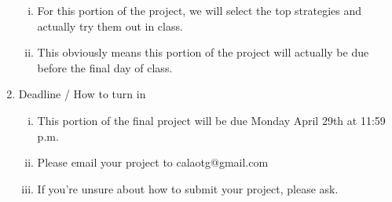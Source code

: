 \documentclass[11.5pt]{article}
\begin{document}
\begin{enumerate}
	\begin{enumerate}[(i)]
	\item For this portion of the project, we will select the top strategies and actually try them out in class.
	\item This obviously means this portion of the project will actually be due before the final day of class.
	\end{enumerate}
\item Deadline / How to turn in
	\begin{enumerate}[(i)]
	\item This portion of the final project will be due Monday April 29th at 11:59 p.m.
	\item Please email your project to calaotg@gmail.com
	\item If you're unsure about how to submit your project, please ask.
	\end{enumerate}
\end{enumerate}
\end{document}
